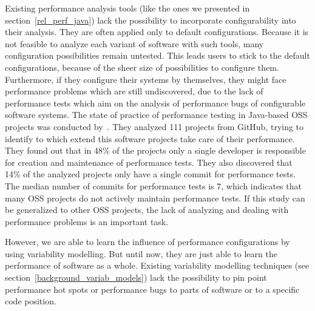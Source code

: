 Existing performance analysis tools (like the ones we presented in section~\ref{rel_perf_java}) lack the possibility to incorporate configurability into their analysis. They are often applied only to default configurations. Because it is not feasible to analyze each variant of software with such tools, many configuration possibilities remain untested. This leads users to stick to the default configurations, because of the sheer size of possibilities to configure them. Furthermore, if they configure their systems by themselves, they might face performance problems which are still undiscovered, due to the lack of performance tests which aim on the analysis of performance bugs of configurable software systems. The state of practice of performance testing in Java-based \ac{OSS} projects was conducted by~\cite{leitner2017exploratory}. They analyzed 111 projects from GitHub, trying to identify to which extend this software projects take care of their performance. They found out that in 48\% of the projects only a single developer is responsible for creation and maintenance of performance tests. They also discovered that 14\% of the analyzed projects only have a single commit for performance tests. The median number of commits for performance tests is 7, which indicates that many \ac{OSS} projects do not actively maintain performance tests. If this study can be generalized to other \ac{OSS} projects, the lack of analyzing and dealing with performance problems is an important task.

However, we are able to learn the influence of performance configurations by using variability modelling. But until now, they are just able to learn the performance of software as a whole. Existing variability modelling techniques (see section~\ref{background_variab_models}) lack the possibility to pin point performance hot spots or performance bugs to parts of software or to a specific code position.



